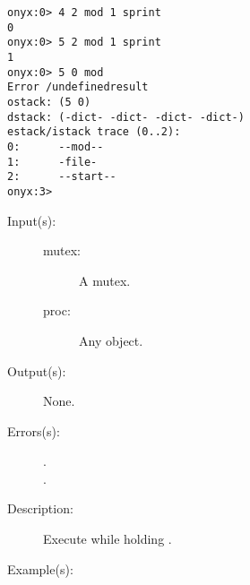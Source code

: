 \begin{description}
\begin{description}
\begin{verbatim}
onyx:0> 4 2 mod 1 sprint
0
onyx:0> 5 2 mod 1 sprint
1
onyx:0> 5 0 mod
Error /undefinedresult
ostack: (5 0)
dstack: (-dict- -dict- -dict- -dict-)
estack/istack trace (0..2):
0:      --mod--
1:      -file-
2:      --start--
onyx:3>
		\end{verbatim}
	\end{description}
\label{systemdict:monitor}
\item[{\onyxop{mutex proc}{monitor}{--}}: ]
	\begin{description}\item[]
	\item[Input(s): ]
		\begin{description}\item[]
		\item[mutex: ]
			A mutex.
		\item[proc: ]
			Any object.
		\end{description}
	\item[Output(s): ] None.
	\item[Errors(s): ]
		\begin{description}\item[]
		\item[.]
		\item[.]
		\end{description}
	\item[Description: ]
		Execute  while holding .
	\item[Example(s): ]\begin{verbatim}


\end{verbatim}
\end{description}
\end{description}
